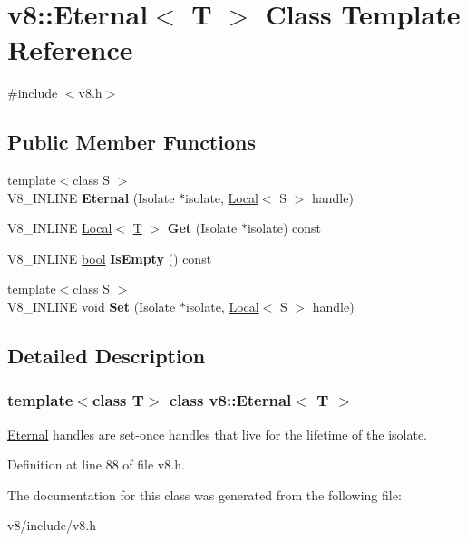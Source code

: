 \hypertarget{classv8_1_1Eternal}{}\section{v8\+:\+:Eternal$<$ T $>$ Class Template Reference}
\label{classv8_1_1Eternal}


{\ttfamily \#include $<$v8.\+h$>$}

\subsection*{Public Member Functions}
\begin{DoxyCompactItemize}
\item 
\mbox{\label{classv8_1_1Eternal_ad7522d8b51e072dcbc4261bc1f155bcb}} 
{\footnotesize template$<$class S $>$ }\\V8\+\_\+\+I\+N\+L\+I\+NE {\bfseries Eternal} (Isolate $\ast$isolate, \mbox{\hyperlink{classv8_1_1Local}{Local}}$<$ S $>$ handle)
\item 
\mbox{\label{classv8_1_1Eternal_a2a615f9cdc8ae38d2380065488c2a397}} 
V8\+\_\+\+I\+N\+L\+I\+NE \mbox{\hyperlink{classv8_1_1Local}{Local}}$<$ \mbox{\hyperlink{classv8_1_1internal_1_1torque_1_1T}{T}} $>$ {\bfseries Get} (Isolate $\ast$isolate) const
\item 
\mbox{\label{classv8_1_1Eternal_a7548826960a4f34ee36947f4fa3765d7}} 
V8\+\_\+\+I\+N\+L\+I\+NE \mbox{\hyperlink{classbool}{bool}} {\bfseries Is\+Empty} () const
\item 
\mbox{\label{classv8_1_1Eternal_a75a32f5c428a0d47e13f66dbdeb9adba}} 
{\footnotesize template$<$class S $>$ }\\V8\+\_\+\+I\+N\+L\+I\+NE void {\bfseries Set} (Isolate $\ast$isolate, \mbox{\hyperlink{classv8_1_1Local}{Local}}$<$ S $>$ handle)
\end{DoxyCompactItemize}


\subsection{Detailed Description}
\subsubsection*{template$<$class T$>$\newline
class v8\+::\+Eternal$<$ T $>$}

\mbox{\hyperlink{classv8_1_1Eternal}{Eternal}} handles are set-\/once handles that live for the lifetime of the isolate. 

Definition at line 88 of file v8.\+h.



The documentation for this class was generated from the following file\+:\begin{DoxyCompactItemize}
\item 
v8/include/v8.\+h\end{DoxyCompactItemize}
